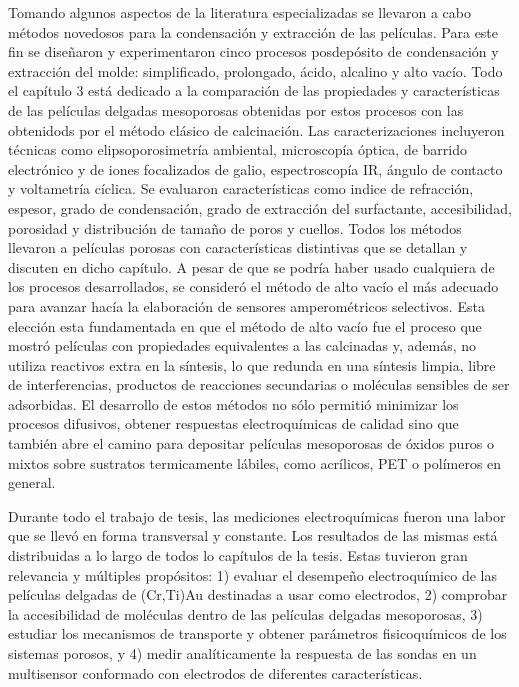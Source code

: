 Tomando algunos aspectos de la literatura especializadas se llevaron a cabo métodos novedosos para la condensación y extracción de las películas. Para este fin se diseñaron y experimentaron cinco procesos posdepósito de condensación y extracción del molde: simplificado, prolongado, ácido, alcalino y alto vacío. Todo el capítulo 3 está dedicado a la comparación de las propiedades y características de las películas delgadas mesoporosas obtenidas por estos procesos con las obtenidods por el método clásico de calcinación. Las caracterizaciones incluyeron técnicas como elipsoporosimetría ambiental, microscopía óptica, de barrido electrónico y de iones focalizados de galio, espectroscopía IR, ángulo de contacto y voltametría cíclica. Se evaluaron características como indice de refracción, espesor, grado de condensación, grado de extracción del surfactante, accesibilidad, porosidad y distribución de tamaño de poros y cuellos. Todos los métodos llevaron a películas porosas con características distintivas que se detallan y discuten en dicho capítulo. A pesar de que se podría haber usado cualquiera de los procesos desarrollados, se consideró el método de alto vacío el más adecuado para avanzar hacía la elaboración de sensores amperométricos selectivos. Esta elección esta fundamentada en que el método de alto vacío fue el proceso que mostró películas con propiedades equivalentes a las calcinadas y, además, no utiliza reactivos extra en la síntesis, lo que redunda en una síntesis limpia, libre de interferencias, productos de reacciones secundarias o moléculas sensibles de ser adsorbidas. El desarrollo de estos métodos no sólo permitió minimizar los procesos difusivos, obtener respuestas electroquímicas de calidad sino que también abre el camino para depositar películas mesoporosas de óxidos puros o mixtos sobre sustratos termicamente lábiles, como acrílicos, PET o polímeros en general.

Durante todo el trabajo de tesis, las mediciones electroquímicas fueron una labor que se llevó en forma transversal y constante. Los resultados de las mismas está distribuidas a lo largo de todos lo capítulos de la tesis. Estas tuvieron gran relevancia y múltiples propósitos: 1) evaluar el desempeño electroquímico de las películas delgadas de (Cr,Ti)\textbar Au destinadas a usar como electrodos, 2) comprobar la accesibilidad de moléculas dentro de las películas delgadas mesoporosas, 3) estudiar los mecanismos de transporte y obtener parámetros fisicoquímicos de los sistemas porosos, y 4) medir analíticamente la respuesta de las sondas en un multisensor conformado con electrodos de diferentes características.

